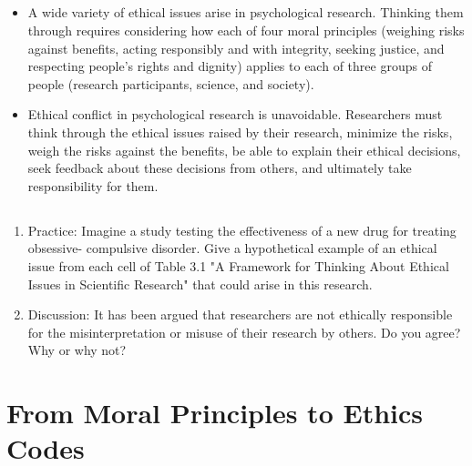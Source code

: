\subsection{}
\begin{fullwidth}
\begin{itemize}
\item A wide variety of ethical issues arise in psychological research. Thinking them through requires considering how each of four moral principles (weighing risks against benefits, acting responsibly and with integrity, seeking justice, and respecting people's rights and dignity) applies to each of three groups of people (research participants, science, and society).
\item Ethical conflict in psychological research is unavoidable. Researchers must think through the ethical issues raised by their research, minimize the risks, weigh the risks against the benefits, be able to explain their ethical decisions, seek feedback about these decisions from others, and ultimately take responsibility for them.
\end{itemize}
\end{fullwidth}

\subsection{}
\begin{fullwidth}
\begin{enumerate}
\item Practice: Imagine a study testing the effectiveness of a new drug for treating obsessive- compulsive disorder. Give a hypothetical example of an ethical issue from each cell of Table 3.1 "A Framework for Thinking About Ethical Issues in Scientific Research" that could arise in this research.
\item Discussion: It has been argued that researchers are not ethically responsible for the misinterpretation or misuse of their research by others. Do you agree? Why or why not?
\end{enumerate}
\end{fullwidth}  

\newpage
\section{From Moral Principles to Ethics Codes}



